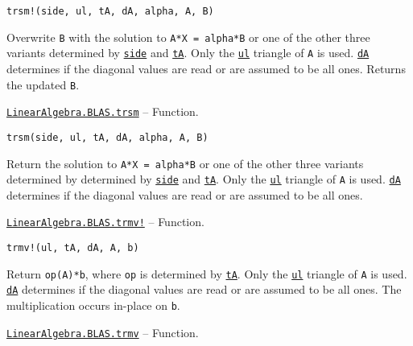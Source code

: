 \begin{adjustwidth}{2em}{0pt}


\begin{verbatim}
trsm!(side, ul, tA, dA, alpha, A, B)
\end{verbatim}

Overwrite \texttt{B} with the solution to \texttt{A*X = alpha*B} or one of the other three variants determined by \hyperlink{3128026147631247774}{\texttt{side}} and \hyperlink{15951037910221396131}{\texttt{tA}}. Only the \hyperlink{13880289478825450693}{\texttt{ul}} triangle of \texttt{A} is used. \hyperlink{285101993251198425}{\texttt{dA}} determines if the diagonal values are read or are assumed to be all ones. Returns the updated \texttt{B}.



\end{adjustwidth}
\hypertarget{5446048787435487351}{}
\hyperlink{5446048787435487351}{\texttt{LinearAlgebra.BLAS.trsm}}  -- {Function.}

\begin{adjustwidth}{2em}{0pt}


\begin{verbatim}
trsm(side, ul, tA, dA, alpha, A, B)
\end{verbatim}

Return the solution to \texttt{A*X = alpha*B} or one of the other three variants determined by determined by \hyperlink{3128026147631247774}{\texttt{side}} and \hyperlink{15951037910221396131}{\texttt{tA}}. Only the \hyperlink{13880289478825450693}{\texttt{ul}} triangle of \texttt{A} is used. \hyperlink{285101993251198425}{\texttt{dA}} determines if the diagonal values are read or are assumed to be all ones.



\end{adjustwidth}
\hypertarget{12526002304770163470}{}
\hyperlink{12526002304770163470}{\texttt{LinearAlgebra.BLAS.trmv!}}  -- {Function.}

\begin{adjustwidth}{2em}{0pt}


\begin{verbatim}
trmv!(ul, tA, dA, A, b)
\end{verbatim}

Return \texttt{op(A)*b}, where \texttt{op} is determined by \hyperlink{15951037910221396131}{\texttt{tA}}. Only the \hyperlink{13880289478825450693}{\texttt{ul}} triangle of \texttt{A} is used. \hyperlink{285101993251198425}{\texttt{dA}} determines if the diagonal values are read or are assumed to be all ones. The multiplication occurs in-place on \texttt{b}.



\end{adjustwidth}
\hypertarget{17600708624629588635}{}
\hyperlink{17600708624629588635}{\texttt{LinearAlgebra.BLAS.trmv}}  -- {Function.}


